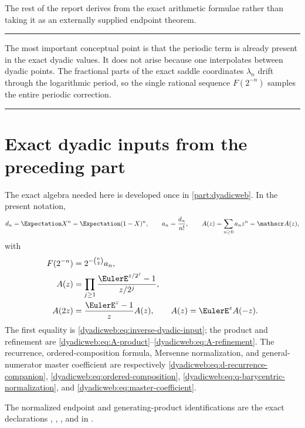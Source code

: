 \documentclass[11pt,oneside]{article}
\theoremstyle{definition}
\theoremstyle{remark}
\newenvironment{boxedremark}{%
  \par\smallskip\noindent\begin{center}\begin{minipage}{0.94\textwidth}%
  \color{black}\hrule\vspace{0.6em}\small
}{%
  \vspace{0.6em}\hrule\end{minipage}\end{center}\smallskip
}
\begin{document}
The rest of the report derives  from the exact arithmetic formulae rather
than taking it as an externally supplied endpoint theorem.

\begin{boxedremark}
The most important conceptual point is that the periodic term is already present in the exact
dyadic values.  It does not arise because one interpolates between dyadic points.  The
fractional parts of the exact saddle coordinates $\lambda_n$ drift through the logarithmic
period, so the single rational sequence $F(2^{-n})$ samples the entire periodic correction.
\end{boxedremark}

\section{Exact dyadic inputs from the preceding part}
\label{dyadicasym:sec:exact-inputs}

The exact algebra needed here is developed once in
\cref{part:dyadicweb}.  In the present notation,
\begin{equation}
 d_n=\Expectation X^n=\Expectation(1-X)^n,\qquad
 a_n=\frac{d_n}{n!},\qquad
 A(z)=\sum_{n\ge0}a_nz^n=\mathscr A(z),                  \label{dyadicasym:eq:an-A}
\end{equation}
with
\begin{align}
 F(2^{-n})&=2^{-\binom n2}a_n,                             \label{dyadicasym:eq:F-an}\\
 A(z)&=\prod_{j\ge1}\frac{\EulerE^{z/2^j}-1}{z/2^j},          \label{dyadicasym:eq:A-product}\\
 A(2z)&=\frac{\EulerE^z-1}{z}A(z),\qquad A(z)=\EulerE^zA(-z).     \label{dyadicasym:eq:A-reflection}
\end{align}
The first equality is \eqref{dyadicweb:eq:inverse-dyadic-input}; the product and
refinement are \eqref{dyadicweb:eq:A-product}--\eqref{dyadicweb:eq:A-refinement}.
The recurrence, ordered-composition formula, Mersenne normalization, and general-numerator
master coefficient are respectively
\eqref{dyadicweb:eq:d-recurrence-companion},
\eqref{dyadicweb:eq:ordered-composition},
\eqref{dyadicweb:eq:q-barycentric-normalization}, and
\eqref{dyadicweb:eq:master-coefficient}.

The normalized endpoint and generating-product identifications are the exact declarations
,
,
, and
 in
.
\end{document}
